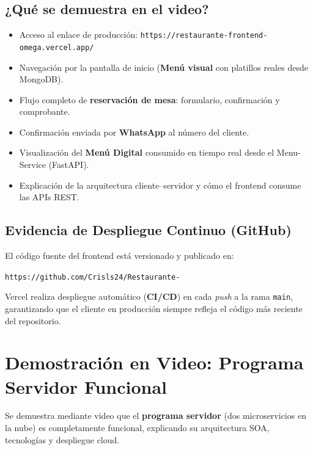 \documentclass[12pt,a4paper]{article}
\begin{document}
\subsection{¿Qué se demuestra en el video?}

\begin{itemize}
  \item Acceso al enlace de producción: \texttt{https://restaurante-frontend-omega.vercel.app/}
  \item Navegación por la pantalla de inicio (\textbf{Menú visual} con platillos reales desde MongoDB).
  \item Flujo completo de \textbf{reservación de mesa}: formulario, confirmación y comprobante.
  \item Confirmación enviada por \textbf{WhatsApp} al número del cliente.
  \item Visualización del \textbf{Menú Digital} consumido en tiempo real desde el Menu-Service (FastAPI).
  \item Explicación de la arquitectura cliente--servidor y cómo el frontend consume las APIs REST.
\end{itemize}

\subsection{Evidencia de Despliegue Continuo (GitHub)}

El código fuente del frontend está versionado y publicado en:
\begin{center}
  \texttt{https://github.com/Crisls24/Restaurante-}
\end{center}
Vercel realiza despliegue automático (\textbf{CI/CD}) en cada \textit{push} a la rama \texttt{main}, garantizando que el cliente en producción siempre refleja el código más reciente del repositorio.

\section{Demostración en Video: Programa Servidor Funcional}

\begin{tcolorbox}[title=Criterio de Evaluación --- Punto 10: El programa servidor es funcional (15 pts)]
Se demuestra mediante video que el \textbf{programa servidor} (dos microservicios en la nube) es completamente funcional,
explicando su arquitectura SOA, tecnologías y despliegue cloud.
\end{tcolorbox}
\end{document}
